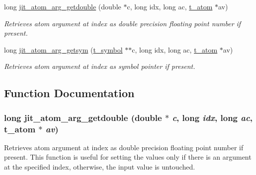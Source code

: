 \begin{DoxyCompactItemize}
long \hyperlink{group__atommod_gaa6cfeff56be144abc839b07d0f8cc373}{jit\_\-atom\_\-arg\_\-getdouble} (double $\ast$c, long idx, long ac, \hyperlink{structt__atom}{t\_\-atom} $\ast$av)
\begin{DoxyCompactList}\small\item\em Retrieves atom argument at index as double precision floating point number if present. \item\end{DoxyCompactList}\item 
long \hyperlink{group__atommod_ga6be2fbebadc03614cd5e621da17ff289}{jit\_\-atom\_\-arg\_\-getsym} (\hyperlink{structt__symbol}{t\_\-symbol} $\ast$$\ast$c, long idx, long ac, \hyperlink{structt__atom}{t\_\-atom} $\ast$av)
\begin{DoxyCompactList}\small\item\em Retrieves atom argument at index as symbol pointer if present. \item\end{DoxyCompactList}\end{DoxyCompactItemize}


\subsection{Function Documentation}
\hypertarget{group__atommod_gaa6cfeff56be144abc839b07d0f8cc373}{
\subsubsection[{jit\_\-atom\_\-arg\_\-getdouble}]{\setlength{\rightskip}{0pt plus 5cm}long jit\_\-atom\_\-arg\_\-getdouble (double $\ast$ {\em c}, \/  long {\em idx}, \/  long {\em ac}, \/  {\bf t\_\-atom} $\ast$ {\em av})}}
\label{group__atommod_gaa6cfeff56be144abc839b07d0f8cc373}


Retrieves atom argument at index as double precision floating point number if present. This function is useful for setting the values only if there is an argument at the specified index, otherwise, the input value is untouched.


